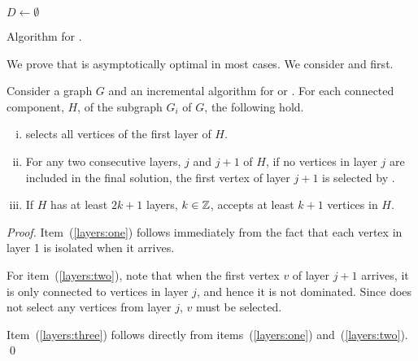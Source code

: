 \begin{algorithm} \DontPrintSemicolon
\SetNoFillComment
\SetAlgoNoLine
{}
{\normalsize
\BlankLine
   $D \gets \emptyset$\;
   }
 \caption{Algorithm \alayersparent for \tds.\label{alg:LPtds}}
\end{algorithm}


We prove that \alayersparent is asymptotically optimal in most cases.
We consider \ds and \cds first.

\begin{lemma}
\label{lemma:layers}
Consider a graph $G$ and an incremental algorithm \ALG for \ds or \cds.
For each connected component, $H$, of the subgraph $G_i$ of $G$, the following hold.
\begin{enumerate}[(i)]
\item \label{layers:one}
 \ALG selects all vertices of the first layer of $H$.
\item \label{layers:two}
  For any two consecutive layers, $j$ and $j+1$ of $H$, if no
  vertices in layer $j$ are included in the final solution, the first
  vertex of layer $j+1$ is selected by \ALG.
\item \label{layers:three}
  If $H$ has at least $2k+1$ layers, $k \in \mathbb{Z}$, \ALG accepts at least
  $k+1$ vertices in $H$.
\end{enumerate}
\end{lemma}
\begin{proof}
Item~(\ref{layers:one}) follows immediately from the fact that each vertex in
layer 1 is isolated when it arrives. 

For item~(\ref{layers:two}), note that when the first vertex $v$ of layer $j+1$
arrives, it is only connected to vertices in layer $j$, and hence it
is not dominated. 
Since \ALG does not select any vertices from layer $j$, $v$ must be
selected. 

Item~(\ref{layers:three}) follows directly from items~(\ref{layers:one})
and~(\ref{layers:two}).
\qed\end{proof}


